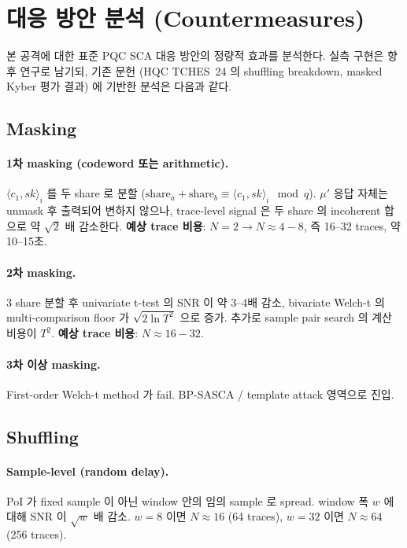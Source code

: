 \documentclass[11pt]{article}
\theoremstyle{plain}
\theoremstyle{definition}
\theoremstyle{remark}
\begin{document}
\section{대응 방안 분석 (Countermeasures)}
\label{sec:countermeasures}

본 공격에 대한 표준 PQC SCA 대응 방안의 정량적 효과를 분석한다.
실측 구현은 향후 연구로 남기되, 기존 문헌 (HQC TCHES~24 의 shuffling
breakdown, masked Kyber 평가 결과) 에 기반한 분석은 다음과 같다.

\subsection{Masking}

\paragraph{1차 masking (codeword 또는 arithmetic).}
$\langle c_1, sk \rangle_i$ 를 두 share 로 분할 ($\mathrm{share}_a + \mathrm{share}_b
\equiv \langle c_1, sk \rangle_i \mod q$). $\mu'$ 응답 자체는 unmask 후 출력되어
변하지 않으나, trace-level signal 은 두 share 의 incoherent 합으로 약 $\sqrt{2}$
배 감소한다.
\textbf{예상 trace 비용}: $N=2 \to N \approx 4-8$, 즉 16--32 traces, 약 10--15초.

\paragraph{2차 masking.}
3 share 분할 후 univariate t-test 의 SNR 이 약 3--4배 감소, bivariate Welch-t
의 multi-comparison floor 가 $\sqrt{2 \ln T^2}$ 으로 증가. 추가로 sample
pair search 의 계산 비용이 $T^2$.
\textbf{예상 trace 비용}: $N \approx 16-32$.

\paragraph{3차 이상 masking.}
First-order Welch-t method 가 fail. BP-SASCA / template attack 영역으로 진입.

\subsection{Shuffling}

\paragraph{Sample-level (random delay).}
PoI 가 fixed sample 이 아닌 window 안의 임의 sample 로 spread.
window 폭 $w$ 에 대해 SNR 이 $\sqrt{w}$ 배 감소. $w=8$ 이면 $N \approx 16$
(64 traces), $w=32$ 이면 $N \approx 64$ (256 traces).
\end{document}
